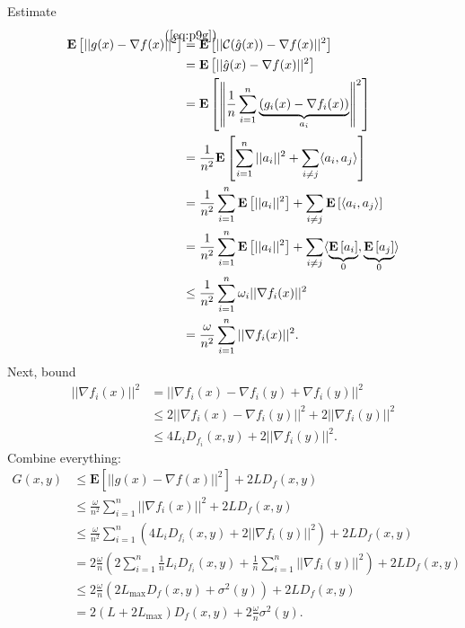 \documentclass[12pt]{article}
\newcommand{\defeq}[2]{\stackrel{\mathclap{\normalfont\mbox{#1}}}{#2}}
\begin{document}
Estimate
\begin{equation*}
    \begin{split}
        \mathbf{E}\left[ ||g(x) - \nabla f(x)||^2 \right] &\defeq{(\ref{eq:p9g})}{=} \mathbf{E}\left[ ||\mathcal{C}(\hat{g}(x)) - \nabla f(x)||^2 \right] \\
                &= \mathbf{E}\left[ ||\hat{g}(x) - \nabla f(x)||^2 \right] \\
                &= \mathbf{E}\left[ \left\| \frac{1}{n} \sum_{i=1}^n \underbrace{(g_i(x) - \nabla f_i(x))}_{a_i}\right\|^2\right] \\
                &= \frac{1}{n^2} \mathbf{E}\left[\sum_{i=1}^n ||a_i||^2 + \sum_{i\neq j}\langle a_i, a_j \rangle \right] \\
                &= \frac{1}{n^2} \sum_{i=1}^n \mathbf{E}\left[||a_i||^2\right] + \sum_{i\neq j} \mathbf{E}\left[\langle a_i, a_j \rangle \right] \\
                &= \frac{1}{n^2} \sum_{i=1}^n \mathbf{E}\left[||a_i||^2\right] + \sum_{i\neq j} \langle \underbrace{\mathbf{E}\left[a_i\right]}_{0}, \underbrace{\mathbf{E}\left[a_j\right]}_{0} \rangle \\
                &\leq \frac{1}{n^2} \sum_{i=1}^n \omega_i || \nabla f_i (x)||^2 \\
                &= \frac{\omega}{n^2} \sum_{i=1}^n || \nabla f_i (x)||^2.
    \end{split}
\end{equation*}
Next, bound
\begin{equation*}
    \begin{split}
        || \nabla f_i(x)||^2 &= || \nabla f_i(x) - \nabla f_i(y) + \nabla f_i(y)||^2 \\
                            &\leq 2|| \nabla f_i(x) - \nabla f_i(y)||^2 + 2 || \nabla f_i(y)||^2 \\
                            &\leq 4L_iD_{f_i}(x,y) + 2 ||\nabla f_i(y)||^2.
    \end{split}
\end{equation*}
Combine everything:
\begin{equation}
    \begin{split}
        G(x, y) &\leq \mathbf{E}\left[ ||g(x) - \nabla f(x)||^2 \right] + 2LD_f(x,y) \\
                &\leq \frac{\omega}{n^2} \sum_{i=1}^n || \nabla f_i (x)||^2 + 2LD_f(x,y) \\
                &\leq \frac{\omega}{n^2} \sum_{i=1}^n \left( 4L_iD_{f_i}(x,y) + 2 ||\nabla f_i(y)||^2 \right) + 2LD_f(x,y) \\
                &= 2 \frac{\omega}{n} \left(2 \sum_{i=1}^n \frac{1}{n} L_iD_{f_i}(x,y) + \frac{1}{n} \sum_{i=1}^n ||\nabla f_i(y)||^2 \right)+ 2LD_f(x,y) \\
                &\leq  2 \frac{\omega}{n}\left({2}L_{\text{max}}D_f(x,y) + \sigma^2(y) \right)+ 2LD_f(x,y) \\
                &= 2(L + 2L_{\text{max}})D_f(x,y) + 2 \frac{\omega}{n} \sigma^2(y).
    \end{split}
    \label{eq:gxy_deltanotzero}
\end{equation}
\end{document}
